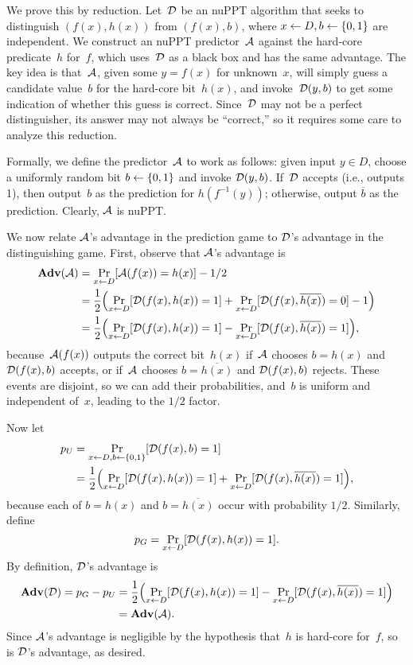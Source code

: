 \documentclass[11pt]{article}
\begin{document}
\begin{answer}
  We prove this by reduction. Let~$\mathcal{D}$ be an nuPPT algorithm that
  seeks to distinguish $(f(x),h(x))$ from $(f(x), b)$, where
  $x \gets D, b \gets \{0,1\}$ are independent. We construct an nuPPT
  predictor~$\mathcal{A}$ against the hard-core predicate~$h$ for~$f$, which
  uses~$\mathcal{D}$ as a black box and has the same advantage. The key idea
  is that~$\mathcal{A}$, given some $y=f(x)$ for unknown~$x$, will simply
  guess a candidate value~$b$ for the hard-core bit~$h(x)$, and
  invoke~$\mathcal{D}(y,b)$ to get some indication of whether this guess is
  correct. Since~$\mathcal{D}$ may not be a perfect distinguisher, its
  answer may not always be ``correct,'' so it requires some care to
  analyze this reduction.

  Formally, we define the predictor~$\mathcal{A}$ to work as follows: given
  input $y \in D$, choose a uniformly random bit $b \gets \{0,1\}$ and
  invoke $\mathcal{D}(y,b)$. If~$\mathcal{D}$ accepts (i.e., outputs 1), then
  output~$b$ as the prediction for $h(f^{-1}(y))$; otherwise, output
  $\overline{b}$ as the prediction.  Clearly, $\mathcal{A}$ is nuPPT.

  We now relate $\mathcal{A}$'s advantage in the prediction game to
  $\mathcal{D}$'s advantage in the distinguishing game. First, observe that
  $\mathcal{A}$'s advantage is
  \begin{align*}
    \advan(\AdvA)
    &= \Pr_{x \gets D}[\AdvA(f(x))=h(x)] - 1/2 \\
    &= \frac12 \parens*{\Pr_{x \gets D}[\calD(f(x),h(x))=1] + \Pr_{x
      \gets D}[\calD(f(x),\overline{h(x)})=0] - 1} \\
    &= \frac12 \parens*{\Pr_{x \gets D}[\calD(f(x),h(x))=1] - \Pr_{x
      \gets D}[\calD(f(x),\overline{h(x)})=1]},
  \end{align*}
  because~$\mathcal{A}(f(x))$ outputs the correct bit~$h(x)$ if~$\mathcal{A}$
  chooses $b=h(x)$ and $\mathcal{D}(f(x),b)$ accepts, or if~$\mathcal{A}$ chooses
  $b=\overline{h(x)}$ and $\mathcal{D}(f(x),b)$ rejects. These events are
  disjoint, so we can add their probabilities, and~$b$ is uniform and
  independent of~$x$, leading to the $1/2$ factor.

  Now let
  \begin{align*}
    p_{U}
    &= \Pr_{x \gets D, b \gets \bit}[\calD(f(x),b) = 1] \\
    &= \frac12 \parens*{\Pr_{x \gets D}[\calD(f(x),h(x)) = 1] + 
      \Pr_{x \gets D}[\calD(f(x), \overline{h(x)}) = 1]},
  \end{align*}
  because each of $b=h(x)$ and $b=\overline{h(x)}$ occur with
  probability $1/2$.  Similarly, define
  \[ p_{G} = \Pr_{x \gets D}[\mathcal{D}(f(x), h(x))=1]. \] By definition,
  $\mathcal{D}$'s advantage is
  \begin{align*}
    \advan(\calD) = p_{G}-p_{U}
    &= \frac12 \parens*{\Pr_{x \gets D}[\calD(f(x),
      h(x))=1] - \Pr_{x \gets D}[\calD(f(x),\overline{h(x)})=1]} \\
    &= \advan(\AdvA).
  \end{align*}
  Since $\mathcal{A}$'s advantage is negligible by the hypothesis that~$h$
  is hard-core for~$f$, so is $\mathcal{D}$'s advantage, as desired.
\end{answer}
\end{document}
